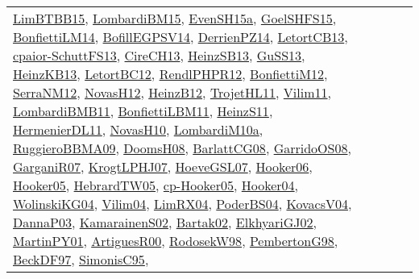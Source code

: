 {\begin{longtable}{lp{3cm}>{\raggedright}p{6cm}>{\raggedright}p{6cm}p{8cm}}
\href{papers/LimBTBB15.pdf}{LimBTBB15}\cite{LimBTBB15}, \href{papers/LombardiBM15.pdf}{LombardiBM15}\cite{LombardiBM15}, \href{articles/EvenSH15a.pdf}{EvenSH15a}\cite{EvenSH15a}, \href{articles/GoelSHFS15.pdf}{GoelSHFS15}\cite{GoelSHFS15}, \href{papers/BonfiettiLM14.pdf}{BonfiettiLM14}\cite{BonfiettiLM14}, \href{papers/BofillEGPSV14.pdf}{BofillEGPSV14}\cite{BofillEGPSV14}, \href{papers/DerrienPZ14.pdf}{DerrienPZ14}\cite{DerrienPZ14}, \href{papers/LetortCB13.pdf}{LetortCB13}\cite{LetortCB13}, \href{papers/cpaior-SchuttFS13.pdf}{cpaior-SchuttFS13}\cite{cpaior-SchuttFS13}, \href{papers/CireCH13.pdf}{CireCH13}\cite{CireCH13}, \href{articles/HeinzSB13.pdf}{HeinzSB13}\cite{HeinzSB13}, \href{papers/GuSS13.pdf}{GuSS13}\cite{GuSS13}, \href{papers/HeinzKB13.pdf}{HeinzKB13}\cite{HeinzKB13}, \href{papers/LetortBC12.pdf}{LetortBC12}\cite{LetortBC12}, \href{papers/RendlPHPR12.pdf}{RendlPHPR12}\cite{RendlPHPR12}, \href{papers/BonfiettiM12.pdf}{BonfiettiM12}\cite{BonfiettiM12}, \href{papers/SerraNM12.pdf}{SerraNM12}\cite{SerraNM12}, \href{articles/NovasH12.pdf}{NovasH12}\cite{NovasH12}, \href{papers/HeinzB12.pdf}{HeinzB12}\cite{HeinzB12}, \href{articles/TrojetHL11.pdf}{TrojetHL11}\cite{TrojetHL11}, \href{papers/Vilim11.pdf}{Vilim11}\cite{Vilim11}, \href{papers/LombardiBMB11.pdf}{LombardiBMB11}\cite{LombardiBMB11}, \href{papers/BonfiettiLBM11.pdf}{BonfiettiLBM11}\cite{BonfiettiLBM11}, \href{papers/HeinzS11.pdf}{HeinzS11}\cite{HeinzS11}, \href{papers/HermenierDL11.pdf}{HermenierDL11}\cite{HermenierDL11}, \href{articles/NovasH10.pdf}{NovasH10}\cite{NovasH10}, \href{articles/LombardiM10a.pdf}{LombardiM10a}\cite{LombardiM10a}, \href{articles/RuggieroBBMA09.pdf}{RuggieroBBMA09}\cite{RuggieroBBMA09}, \href{papers/DoomsH08.pdf}{DoomsH08}\cite{DoomsH08}, \href{papers/BarlattCG08.pdf}{BarlattCG08}\cite{BarlattCG08}, \href{articles/GarridoOS08.pdf}{GarridoOS08}\cite{GarridoOS08}, \href{papers/GarganiR07.pdf}{GarganiR07}\cite{GarganiR07}, \href{papers/KrogtLPHJ07.pdf}{KrogtLPHJ07}\cite{KrogtLPHJ07}, \href{papers/HoeveGSL07.pdf}{HoeveGSL07}\cite{HoeveGSL07}, \href{articles/Hooker06.pdf}{Hooker06}\cite{Hooker06}, \href{articles/Hooker05.pdf}{Hooker05}\cite{Hooker05}, \href{papers/HebrardTW05.pdf}{HebrardTW05}\cite{HebrardTW05}, \href{papers/cp-Hooker05.pdf}{cp-Hooker05}\cite{cp-Hooker05}, \href{papers/Hooker04.pdf}{Hooker04}\cite{Hooker04}, \href{papers/WolinskiKG04.pdf}{WolinskiKG04}\cite{WolinskiKG04}, \href{papers/Vilim04.pdf}{Vilim04}\cite{Vilim04}, \href{papers/LimRX04.pdf}{LimRX04}\cite{LimRX04}, \href{articles/PoderBS04.pdf}{PoderBS04}\cite{PoderBS04}, \href{papers/KovacsV04.pdf}{KovacsV04}\cite{KovacsV04}, \href{papers/DannaP03.pdf}{DannaP03}\cite{DannaP03}, \href{papers/KamarainenS02.pdf}{KamarainenS02}\cite{KamarainenS02}, \href{papers/Bartak02.pdf}{Bartak02}\cite{Bartak02}, \href{papers/ElkhyariGJ02.pdf}{ElkhyariGJ02}\cite{ElkhyariGJ02}, \href{articles/MartinPY01.pdf}{MartinPY01}\cite{MartinPY01}, \href{articles/ArtiguesR00.pdf}{ArtiguesR00}\cite{ArtiguesR00}, \href{papers/RodosekW98.pdf}{RodosekW98}\cite{RodosekW98}, \href{papers/PembertonG98.pdf}{PembertonG98}\cite{PembertonG98}, \href{papers/BeckDF97.pdf}{BeckDF97}\cite{BeckDF97}, \href{papers/SimonisC95.pdf}{SimonisC95}\cite{SimonisC95}, 
\end{longtable}}
